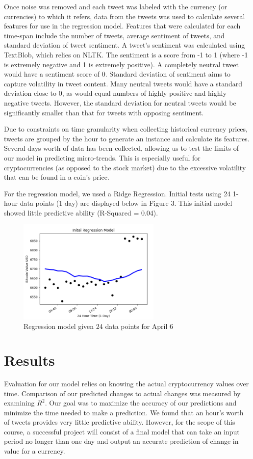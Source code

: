 \documentclass[sigconf]{acmart}
\begin{document}
Once noise was removed and each tweet was labeled with the currency (or currencies) to which it refers, data from the tweets was used to calculate several features for use in the regression model. Features that were calculated for each time-span include the number of tweets, average sentiment of tweets, and standard deviation of tweet sentiment. A tweet's sentiment was calculated using TextBlob, which relies on NLTK. The sentiment is a score from -1 to 1 (where -1 is extremely negative and 1 is extremely positive). A completely neutral tweet would have a sentiment score of 0. Standard deviation of sentiment aims to capture volatility in tweet content. Many neutral tweets would have a standard deviation close to 0, as would equal numbers of highly positive and highly negative tweets. However, the standard deviation for neutral tweets would be significantly smaller than that for tweets with opposing sentiment. 

Due to constraints on time granularity when collecting historical currency prices, tweets are grouped by the hour to generate an instance and calculate its features. Several days worth of data has been collected, allowing us to test the limits of our model in predicting micro-trends. This is especially useful for cryptocurrencies (as opposed to the stock market) due to the excessive volatility that can be found in a coin's price.

For the regression model, we used a Ridge Regression. Initial tests using 24 1-hour data points (1 day) are displayed below in Figure 3. This initial model showed little predictive ability (R-Squared = 0.04).

\begin{figure}[H]
\caption{Regression model given 24 data points for April 6}
\includegraphics[width=7cm]{regression.png}
\end{figure}

\section{Results}
Evaluation for our model relies on knowing the actual cryptocurrency values over time. Comparison of our predicted changes to actual changes was measured by examining $R^2$. Our goal was to maximize the accuracy of our predictions and minimize the time needed to make a prediction. We found that an hour's worth of tweets provides very little predictive ability. However, for the scope of this course, a successful project will consist of a final model that can take an input period no longer than one day and output an accurate prediction of change in value for a currency.
\end{document}
